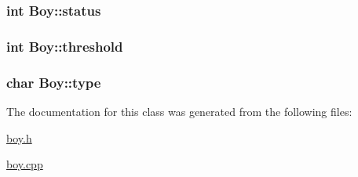\subsubsection[{\texorpdfstring{status}{status}}]{\setlength{\rightskip}{0pt plus 5cm}int Boy\+::status\hspace{0.3cm}{\ttfamily [private]}}\hypertarget{classBoy_aa076c375327eee04ff0f8d0f6ab26b7b}{}\label{classBoy_aa076c375327eee04ff0f8d0f6ab26b7b}
\subsubsection[{\texorpdfstring{threshold}{threshold}}]{\setlength{\rightskip}{0pt plus 5cm}int Boy\+::threshold\hspace{0.3cm}{\ttfamily [private]}}\hypertarget{classBoy_a7fd8bfde3cb2e58ad6dccad2a2f3d50d}{}\label{classBoy_a7fd8bfde3cb2e58ad6dccad2a2f3d50d}
\subsubsection[{\texorpdfstring{type}{type}}]{\setlength{\rightskip}{0pt plus 5cm}char Boy\+::type\hspace{0.3cm}{\ttfamily [private]}}\hypertarget{classBoy_a75a233ee206bbb071167a6a56d5d756b}{}\label{classBoy_a75a233ee206bbb071167a6a56d5d756b}


The documentation for this class was generated from the following files\+:\begin{DoxyCompactItemize}
\item 
\hyperlink{boy_8h}{boy.\+h}\item 
\hyperlink{boy_8cpp}{boy.\+cpp}\end{DoxyCompactItemize}
